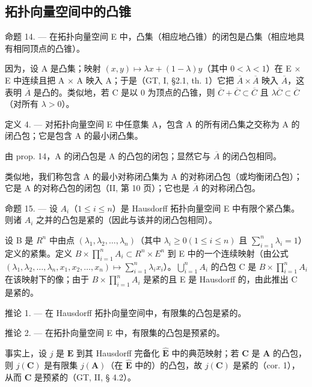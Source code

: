 \subsection{拓扑向量空间中的凸锥}

命题 14. --- 在拓扑向量空间 E 中，凸集（相应地凸锥）的闭包是凸集（相应地具有相同顶点的凸锥）。

因为，设 A 是凸集；映射 \((x, y) \mapsto \lambda x + (1 - \lambda)y\)（其中 \(0 < \lambda < 1\)）在 E × E 中连续且把 A × A 映入 A；于是（GT, I, §2.1, th. 1）它把 \(\overline{A} \times \overline{A}\) 映入 \(\overline{A}\)，这表明 \(\overline{A}\) 是凸的。类似地，若 C 是以 0 为顶点的凸锥，则 \(\overline{C} + \overline{C} \subset \overline{C}\) 且 \(\lambda\overline{C} \subset \overline{C}\)（对所有 \(\lambda > 0\)）。

定义 4. --- 对拓扑向量空间 E 中任意集 A，包含 A 的所有闭凸集之交称为 A 的闭凸包；它是包含 A 的最小闭凸集。

由 prop. 14，A 的闭凸包是 A 的凸包的闭包；显然它与 \(\overline{A}\) 的闭凸包相同。

类似地，我们称包含 A 的最小对称闭凸集为 A 的对称闭凸包（或均衡闭凸包）；它是 A 的对称凸包的闭包（II, 第 10 页）；它也是 \(\overline{A}\) 的对称闭凸包。

命题 15. --- 设 \(A_{i}\)（\(1 \leqslant i \leqslant n\)）是 Hausdorff 拓扑向量空间 E 中有限个紧凸集。则诸 \(A_{i}\) 之并的凸包是紧的（因此与该并的闭凸包相同）。

设 B 是 \(R^{n}\) 中由点 \((\lambda_{1},\lambda_{2},\ldots,\lambda_{n})\)（其中 \(\lambda_{i}\geqslant0(1\leqslant i\leqslant n)\) 且 \(\sum_{i=1}^{n}\lambda_{i}=1\)）定义的紧集。定义 \(B\times\prod_{i=1}^{n}A_{i}\subset R^{n}\times E^{n}\) 到 E 中的一个连续映射（由公式 \((\lambda_{1},\lambda_{2},\ldots,\lambda_{n},x_{1},x_{2},\ldots,x_{n})\mapsto\sum_{i=1}^{n}\lambda_{i}x_{i}\)）。\(\bigcup_{i=1}^{n}A_{i}\) 的凸包 C 是 \(B\times\prod_{i=1}^{n}A_{i}\) 在该映射下的像；由于 \(B\times\prod_{i=1}^{n}A_{i}\) 是紧的且 E 是 Hausdorff 的，由此推出 C 是紧的。

推论 1. --- 在 Hausdorff 拓扑向量空间中，有限集的凸包是紧的。

推论 2. --- 在拓扑向量空间 E 中，有限集的凸包是预紧的。

事实上，设 \(j\) 是 \(\mathbf{E}\) 到其 Hausdorff 完备化 \(\hat{\mathbf{E}}\) 中的典范映射；若 \(\mathbf{C}\) 是 \(\mathbf{A}\) 的凸包，则 \(j(\mathbf{C})\) 是有限集 \(j(\mathbf{A})\)（在 \(\hat{\mathbf{E}}\) 中的）的凸包，故 \(j(\mathbf{C})\) 是紧的（cor. 1），从而 \(\mathbf{C}\) 是预紧的（GT, II, § 4.2）。

